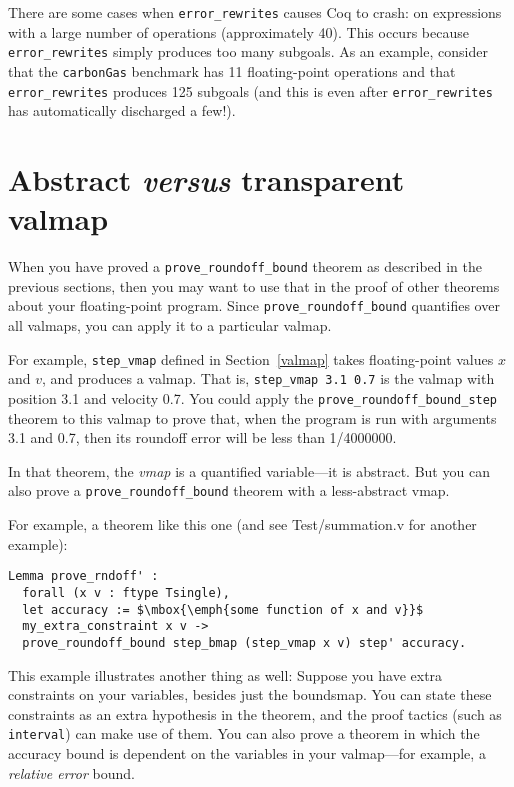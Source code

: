 \documentclass[article]{memoir}
\begin{document}
There are some cases when \lstinline{error_rewrites} causes Coq 
to crash: on expressions with a large number of operations 
(approximately 40). This occurs because 
\lstinline{error_rewrites} simply produces too many subgoals. 
As an example, consider that the 
\lstinline{carbonGas} benchmark has 11 floating-point 
operations and that \lstinline{error_rewrites} produces 125 
subgoals (and this is even after \lstinline{error_rewrites} has 
automatically discharged a few!). 

\chapter{Abstract \emph{versus} transparent valmap}

When you have proved a \lstinline{prove_roundoff_bound} theorem
as described in the previous sections, then you may want to
use that in the proof of other theorems about your floating-point
program.  Since \lstinline{prove_roundoff_bound} quantifies over
all valmaps, you can apply it to a particular valmap.

For example, \lstinline{step_vmap} defined in Section~\ref{valmap}
takes floating-point values $x$ and $v$, and produces a valmap.
That is, \lstinline{step_vmap 3.1 0.7} is the valmap with
position 3.1 and velocity 0.7.  You could apply the
\lstinline{prove_roundoff_bound_step} theorem to this valmap
to prove that, when the program is run with arguments
3.1 and 0.7, then its roundoff error will be less than 1/4000000.

In that theorem, the \emph{vmap} is a quantified variable---it is
abstract.  But you can also prove a \lstinline{prove_roundoff_bound}
theorem with a less-abstract vmap.

For example, a theorem like this one (and see Test/summation.v
for another example):
\begin{lstlisting}
Lemma prove_rndoff' :
  forall (x v : ftype Tsingle),
  let accuracy := $\mbox{\emph{some function of x and v}}$
  my_extra_constraint x v ->   
  prove_roundoff_bound step_bmap (step_vmap x v) step' accuracy.
\end{lstlisting}  

This example illustrates another thing as well:  Suppose you have
extra constraints on your variables, besides just the boundsmap.
You can state these constraints as an extra hypothesis
in the theorem, and the proof tactics (such as \lstinline{interval}) can
make use of them.  You can also prove a theorem in which the
accuracy bound is dependent on the variables in your valmap---for example,
a \emph{relative error} bound.
\end{document}
